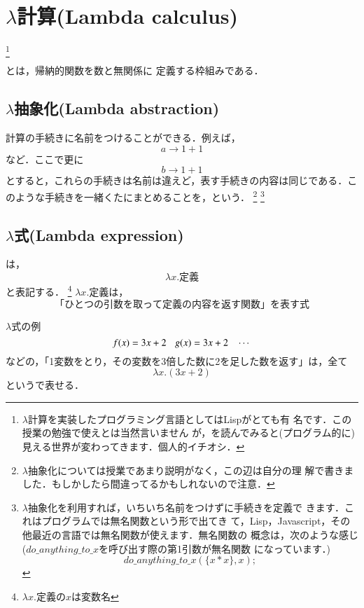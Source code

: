 \chapter{$\lambda$計算(Lambda calculus)}
\footnote{$\lambda$計算を実装したプログラミング言語としてはLispがとても有
名です．この授業の勉強で使えとは当然言いません
が，\cite{Gerald_Julie_Harold_和田200002}を読んでみると(プログラム的に)
見える世界が変わってきます．個人的イチオシ．}

とは，帰納的関数を数と無関係に
定義する枠組みである．

\section{$\lambda$抽象化(Lambda abstraction)}
計算の手続きに名前をつけることができる．例えば，
\[
 a \rightarrow 1+1
\]
など．ここで更に
\[
 b \rightarrow 1+1
\]
とすると，これらの手続きは名前は違えど，表す手続きの内容は同じである．こ
のような手続きを一緒くたにまとめることを，という．
\footnote{$\lambda$抽象化については授業であまり説明がなく，この辺は自分の理
解で書きました．もしかしたら間違ってるかもしれないので注意．}
\footnote{$\lambda$抽象化を利用すれば，いちいち名前をつけずに手続きを定義で
きます．これはプログラムでは無名関数という形で出てき
て，Lisp，Javascript，その他最近の言語では無名関数が使えます．無名関数の
概念は，次のような感じ($do\_anything\_to\_x$を呼び出す際の第1引数が無名関数
になっています．)
\begin{equation} \label{eq:08koukai}
 do\_anything\_to\_x (\{ x * x \}, x); 
\end{equation}
}

\section{$\lambda$式(Lambda expression)}
は，
\[
\lambda x. 定義
\]
と表記する．
 \footnote{$\lambda x. 定義$の$x$は変数名}
$\lambda x.定義$は，
\[
 「ひとつの引数を取って定義の内容を返す関数」を表す式
\]

\begin{myexample}{$\lambda$式の例}
\[
 f(x) = 3x + 2 \hspace{2ex} g(x) = 3x + 2\hspace{2ex}\cdots 
\]
 などの，「1変数をとり，その変数を3倍した数に2を足した数を返す」は，全て
 \[
  \lambda x. (3x+2)
 \]
 というで表せる．
\end{myexample}

